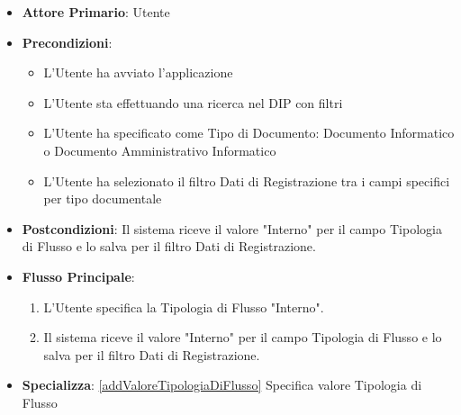 \begin{itemize}
      \item \textbf{Attore Primario}: Utente
      \item \textbf{Precondizioni}: 
      \begin{itemize}            
            \item L'Utente ha avviato l'applicazione
            \item L'Utente sta effettuando una ricerca nel DIP con filtri
            \item L'Utente ha specificato come Tipo di Documento: Documento Informatico o Documento Amministrativo Informatico
            \item L'Utente ha selezionato il filtro Dati di Registrazione tra i campi specifici per tipo documentale
      \end{itemize}
      \item \textbf{Postcondizioni}: Il sistema riceve il valore "Interno" per il campo Tipologia di Flusso e lo salva per il filtro Dati di Registrazione.
      \item \textbf{Flusso Principale}:
      \begin{enumerate}
            \item L'Utente specifica la Tipologia di Flusso "Interno".
            \item Il sistema riceve il valore "Interno" per il campo Tipologia di Flusso e lo salva per il filtro Dati di Registrazione.
      \end{enumerate}
      \item \textbf{Specializza}: \ref{addValoreTipologiaDiFlusso} Specifica valore Tipologia di Flusso
\end{itemize}

